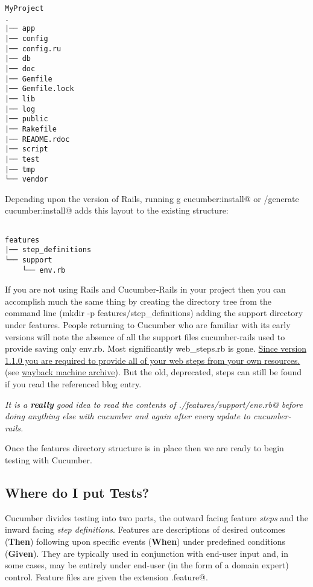 \documentclass[10pt]{book}
\begin{document}
\begin{verbatim}
MyProject
.
|── app
|── config
|── config.ru
|── db
|── doc
|── Gemfile
|── Gemfile.lock
|── lib
|── log
|── public
|── Rakefile
|── README.rdoc
|── script
|── test
|── tmp
└── vendor

\end{verbatim}
Depending upon the version of Rails, running \verb@rails g cucumber:install@ or \verb@script/generate cucumber:install@ adds this layout to the existing structure:
\begin{verbatim}

features
|── step_definitions
└── support
    └── env.rb

\end{verbatim}
If you are not using Rails and Cucumber-Rails in your project then you can accomplish much the same thing by creating the directory tree from the command line (mkdir -p features/step\_definitions) adding the support directory under features.  People returning to Cucumber who are familiar with its early versions will note the absence of all the support files cucumber-rails used to provide saving only env.rb.  Most significantly web\_steps.rb is gone.  \href{http://aslakhellesoy.com/post/11055981222/the-training-wheels-came-off}{Since version 1.1.0 you are required to provide all of your web steps from your own resources.} (see \href{http://web.archive.org/web/20130424133851/http://aslakhellesoy.com/post/11055981222/the-training-wheels-came-off}{wayback machine archive}).  But the old, deprecated, steps can still be found if you read the referenced blog entry.

\emph{ It is a \textbf{really} good idea to read the contents of \verb@./features/support/env.rb@ before doing anything else with cucumber and again after every update to cucumber-rails.}

Once the features directory structure is in place then we are ready to begin testing with Cucumber.

\subsection{Where do I put Tests?}

Cucumber divides testing into two parts, the outward facing feature \emph{steps} and the inward facing \emph{step definitions}.  Features are descriptions of desired outcomes (\textbf{Then}) following upon specific events (\textbf{When}) under predefined conditions (\textbf{Given}).  They are typically used in conjunction with end-user input and, in some cases, may be entirely under end-user (in the form of a domain expert) control. Feature files are given the extension \verb@.feature@.
\end{document}
